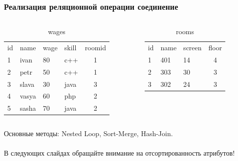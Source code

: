 \documentclass{beamer}
\begin{document}
\begin{frame}
\frametitle{Реализация реляционной операции соединение}

\begin{columns}
  \begin{column}{0.5\textwidth}
    \begin{table}
      \begin{tabular}{ l | l | l | l | c }
        id & name & wage & skill & roomid \\
        1 & ivan & 80 & c++ & 1 \\  
        2 & petr & 50 & c++ & 1 \\
        3 & slava & 30 & java & 3 \\
        4 & vasya & 60 & php & 2 \\
        5 & sasha & 70 & java & 2 \\
      \end{tabular}
      \caption{wages}
    \end{table}
  \end{column}

  \begin{column}{0.5\textwidth}
    \begin{table}
      \begin{tabular}{ l | l | l | c  }
        id & name & screen & floor \\
        1 & 401 & 14 & 4 \\  
        2 & 303 & 30 & 3 \\
        3 & 302 & 24 & 3 \\
      \end{tabular}
      \caption{rooms}
    \end{table}
  \end{column}
\end{columns}

Основные методы: Nested Loop, Sort-Merge, Hash-Join.\\~\\

\alert{В следующих слайдах обращайте внимание на отсортированность атрибутов!}

\end{frame}

\end{document}
